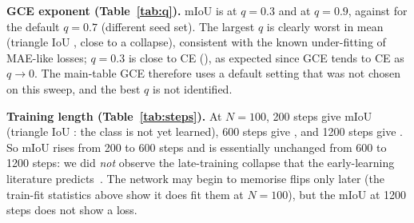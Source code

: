 \begin{table}[t]\centering\caption{GCE exponent $q$ under flip $p=0.3$, $N=500$ (three seeds). $q=0.7$ is the four-seed main row.}\label{tab:q}
\resizebox{\columnwidth}{!}{}\end{table}

\textbf{GCE exponent (Table~\ref{tab:q}).} mIoU is  at $q=0.3$ and  at $q=0.9$, against  for the default $q=0.7$ (different seed set). The largest $q$ is clearly worst in mean (triangle IoU , close to a collapse), consistent with the known under-fitting of MAE-like losses; $q=0.3$ is close to CE (), as expected since GCE tends to CE as $q\to0$. The main-table GCE therefore uses a default setting that was not chosen on this sweep, and the best $q$ is not identified.

\begin{table}[t]\centering\caption{CE training length at $N=100$ under flip $p=0.3$ (three seeds; the 600-step row is in Table~\ref{tab:size}).}\label{tab:steps}
\resizebox{\columnwidth}{!}{}\end{table}

\textbf{Training length (Table~\ref{tab:steps}).} At $N=100$, 200 steps give mIoU  (triangle IoU : the class is not yet learned), 600 steps give , and 1200 steps give . So mIoU rises from 200 to 600 steps and is essentially unchanged from 600 to 1200 steps: we did \emph{not} observe the late-training collapse that the early-learning literature predicts~\cite{arpit2017closer,liu2020early}. The network may begin to memorise flips only later (the train-fit statistics above show it does fit them at $N=100$), but the mIoU at 1200 steps does not show a loss.
